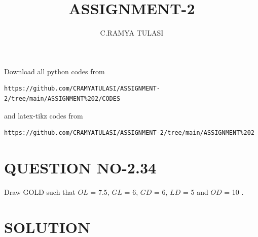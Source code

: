 \documentclass[journal,12pt,twocolumn]{IEEEtran}
\begin{document}
     \def\rightbox#1{\makebox[0in][r]{#1}}
     \def\centbox#1{\makebox[0in]{#1}}
     \def\topbox#1{\raisebox{-\baselineskip}[0in][0in]{#1}}
     \def\midbox#1{\raisebox{-0.5\baselineskip}[0in][0in]{#1}}
\vspace{3cm}
\title{ASSIGNMENT-2}
\author{C.RAMYA TULASI}
\maketitle
\newpage
\bigskip
\renewcommand{\thefigure}{\theenumi}
\renewcommand{\thetable}{\theenumi}
Download all python codes from 
\begin{lstlisting}
https://github.com/CRAMYATULASI/ASSIGNMENT-2/tree/main/ASSIGNMENT%202/CODES
\end{lstlisting}
%
and latex-tikz codes from 
%
\begin{lstlisting}
https://github.com/CRAMYATULASI/ASSIGNMENT-2/tree/main/ASSIGNMENT%202
\end{lstlisting}
%
\section{QUESTION NO-2.34}
\item Draw GOLD such that  $OL$ = 7.5, $GL$ = 6, $GD$ = 6, $LD$ = 5 and $OD$ = 10 .
%
%
\section{SOLUTION}
 
\end{document}
